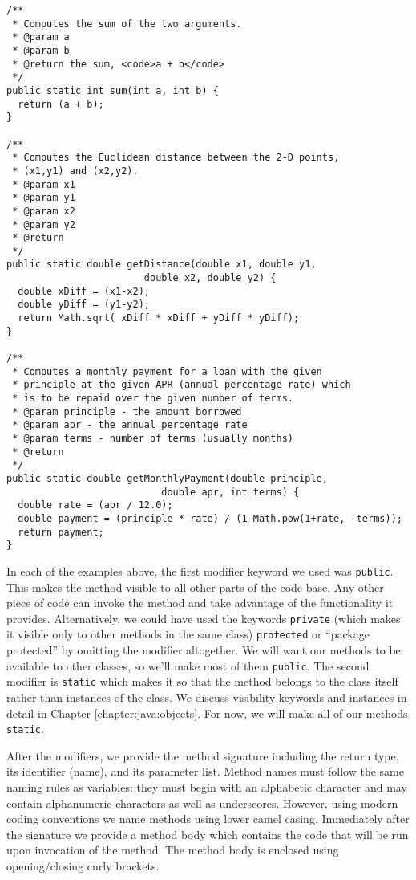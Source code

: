\begin{verbatim}
/**
 * Computes the sum of the two arguments.
 * @param a
 * @param b
 * @return the sum, <code>a + b</code>
 */
public static int sum(int a, int b) {
  return (a + b);
}

/**
 * Computes the Euclidean distance between the 2-D points, 
 * (x1,y1) and (x2,y2).
 * @param x1
 * @param y1
 * @param x2
 * @param y2
 * @return
 */
public static double getDistance(double x1, double y1, 
                        double x2, double y2) {
  double xDiff = (x1-x2);
  double yDiff = (y1-y2);
  return Math.sqrt( xDiff * xDiff + yDiff * yDiff);
}

/**
 * Computes a monthly payment for a loan with the given
 * principle at the given APR (annual percentage rate) which
 * is to be repaid over the given number of terms.
 * @param principle - the amount borrowed
 * @param apr - the annual percentage rate
 * @param terms - number of terms (usually months)
 * @return
 */
public static double getMonthlyPayment(double principle, 
                           double apr, int terms) {
  double rate = (apr / 12.0);
  double payment = (principle * rate) / (1-Math.pow(1+rate, -terms));
  return payment;
}
\end{verbatim}

In each of the examples above, the first modifier keyword we
used was \texttt{public}.  This makes the method visible
to all other parts of the code base.  Any other piece of code can
invoke the method and take advantage of the functionality it
provides.  Alternatively, we could have used the keywords 
\texttt{private} (which makes it visible only to other methods
in the same class) \texttt{protected} or ``package
protected'' by omitting the modifier altogether.  We will
want our methods to be available to other classes, so we'll make 
most of them \texttt{public}.  The second modifier is 
\texttt{static} which makes it so that the method belongs 
to the class itself rather than instances of the class.  We discuss
visibility keywords and instances in detail in Chapter 
\ref{chapter:java:objects}.  For now, we will make all of our methods \texttt{static}.

After the modifiers, we provide the method signature including 
the return type, its identifier (name), and its parameter list.
Method names must follow the same naming rules as variables: 
they must begin with an alphabetic character and may contain 
alphanumeric characters as well as underscores.  However, 
using modern coding conventions  we name methods 
using lower camel casing.  Immediately after the signature we 
provide a method body which contains the code that will be 
run upon invocation of the method.  The method body is enclosed 
using opening/closing curly brackets.


